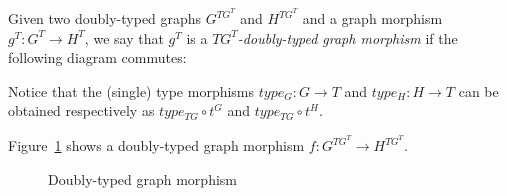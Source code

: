 \begin{definition}
  Given two doubly-typed graphs $G^{TG^T}$ and $H^{TG^T}$ and a graph morphism $g^T : G^T \rightarrow H^T$, we say that $g^T$ is a \emph{$TG^T$-doubly-typed graph morphism} if the following diagram commutes:

\end{definition}

Notice that the (single) type morphisms $type_G : G \rightarrow T$ and $type_H : H \rightarrow T$ can be obtained respectively as $type_{TG} \circ t^G$ and $type_{TG} \circ t^H$.

\begin{example} Figure~\ref{fig:process:doubly-typed-graph-morphism} shows a doubly-typed graph morphism $f : G^{TG^T} \rightarrow H^{TG^T}$.

\begin{figure}[!ht]
  \centering
  \caption{Doubly-typed graph morphism}\label{fig:process:doubly-typed-graph-morphism}
\end{figure}
\end{example}

